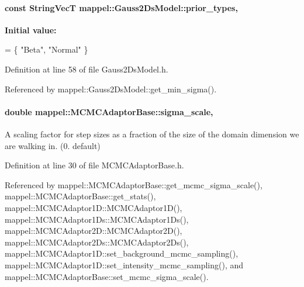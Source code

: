 \paragraph[{\texorpdfstring{prior\+\_\+types}{prior_types}}]{\setlength{\rightskip}{0pt plus 5cm}const {\bf String\+VecT} mappel\+::\+Gauss2\+Ds\+Model\+::prior\+\_\+types\hspace{0.3cm}{\ttfamily [static]}, {\ttfamily [inherited]}}\hypertarget{classmappel_1_1Gauss2DsModel_a9c23ad32b75a80271a0d5ac24138c5ee}{}\label{classmappel_1_1Gauss2DsModel_a9c23ad32b75a80271a0d5ac24138c5ee}
{\bfseries Initial value\+:}
\begin{DoxyCode}
= \{ \textcolor{stringliteral}{"Beta"}, 
                                                \textcolor{stringliteral}{"Normal"}  
                                                 \}
\end{DoxyCode}


Definition at line 58 of file Gauss2\+Ds\+Model.\+h.



Referenced by mappel\+::\+Gauss2\+Ds\+Model\+::get\+\_\+min\+\_\+sigma().

\paragraph[{\texorpdfstring{sigma\+\_\+scale}{sigma_scale}}]{\setlength{\rightskip}{0pt plus 5cm}double mappel\+::\+M\+C\+M\+C\+Adaptor\+Base\+::sigma\+\_\+scale\hspace{0.3cm}{\ttfamily [protected]}, {\ttfamily [inherited]}}\hypertarget{classmappel_1_1MCMCAdaptorBase_a76312f7d589bf3f3e754beca174b884b}{}\label{classmappel_1_1MCMCAdaptorBase_a76312f7d589bf3f3e754beca174b884b}
A scaling factor for step sizes as a fraction of the size of the domain dimension we are walking in. (0. default) 

Definition at line 30 of file M\+C\+M\+C\+Adaptor\+Base.\+h.



Referenced by mappel\+::\+M\+C\+M\+C\+Adaptor\+Base\+::get\+\_\+mcmc\+\_\+sigma\+\_\+scale(), mappel\+::\+M\+C\+M\+C\+Adaptor\+Base\+::get\+\_\+stats(), mappel\+::\+M\+C\+M\+C\+Adaptor1\+D\+::\+M\+C\+M\+C\+Adaptor1\+D(), mappel\+::\+M\+C\+M\+C\+Adaptor1\+Ds\+::\+M\+C\+M\+C\+Adaptor1\+Ds(), mappel\+::\+M\+C\+M\+C\+Adaptor2\+D\+::\+M\+C\+M\+C\+Adaptor2\+D(), mappel\+::\+M\+C\+M\+C\+Adaptor2\+Ds\+::\+M\+C\+M\+C\+Adaptor2\+Ds(), mappel\+::\+M\+C\+M\+C\+Adaptor1\+D\+::set\+\_\+background\+\_\+mcmc\+\_\+sampling(), mappel\+::\+M\+C\+M\+C\+Adaptor1\+D\+::set\+\_\+intensity\+\_\+mcmc\+\_\+sampling(), and mappel\+::\+M\+C\+M\+C\+Adaptor\+Base\+::set\+\_\+mcmc\+\_\+sigma\+\_\+scale().

